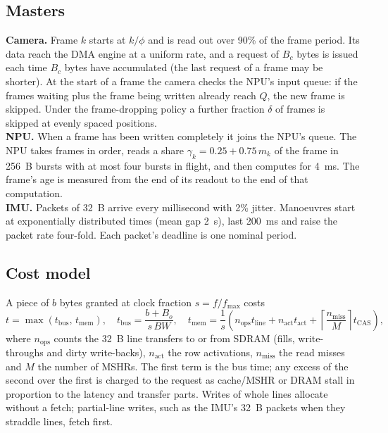 \documentclass[11pt,a4paper]{article}
\begin{document}
\subsection{Masters}
\textbf{Camera.} Frame $k$ starts at $k/\phi$ and is read out over 90\% of the frame period. Its data reach the DMA engine at a uniform rate, and a request of $B_c$ bytes is issued each time $B_c$ bytes have accumulated (the last request of a frame may be shorter). At the start of a frame the camera checks the NPU's input queue: if the frames waiting plus the frame being written already reach $Q$, the new frame is skipped. Under the frame-dropping policy a further fraction $\delta$ of frames is skipped at evenly spaced positions.\\
\textbf{NPU.} When a frame has been written completely it joins the NPU's queue. The NPU takes frames in order, reads a share $\gamma_k=0.25+0.75\,m_k$ of the frame in 256~B bursts with at most four bursts in flight, and then computes for 4~ms. The frame's age is measured from the end of its readout to the end of that computation.\\
\textbf{IMU.} Packets of 32~B arrive every millisecond with 2\% jitter. Manoeuvres start at exponentially distributed times (mean gap 2~s), last 200~ms and raise the packet rate four-fold. Each packet's deadline is one nominal period.

\subsection{Cost model}
A piece of $b$ bytes granted at clock fraction $s=f/f_{\max}$ costs
\begin{equation}
t=\max\left(t_{\mathrm{bus}},\,t_{\mathrm{mem}}\right),\quad t_{\mathrm{bus}}=\frac{b+B_o}{s\,BW},\quad
t_{\mathrm{mem}}=\frac{1}{s}\left(n_{\mathrm{ops}}t_{\mathrm{line}}+n_{\mathrm{act}}t_{\mathrm{act}}+\left\lceil\frac{n_{\mathrm{miss}}}{M}\right\rceil t_{\mathrm{CAS}}\right),
\end{equation}
where $n_{\mathrm{ops}}$ counts the 32~B line transfers to or from SDRAM (fills, write-throughs and dirty write-backs), $n_{\mathrm{act}}$ the row activations, $n_{\mathrm{miss}}$ the read misses and $M$ the number of MSHRs. The first term is the bus time; any excess of the second over the first is charged to the request as cache/MSHR or DRAM stall in proportion to the latency and transfer parts. Writes of whole lines allocate without a fetch; partial-line writes, such as the IMU's 32~B packets when they straddle lines, fetch first.
\end{document}
